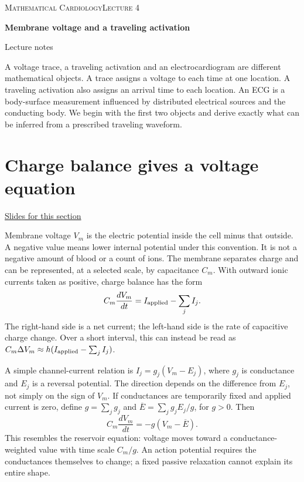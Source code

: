 \documentclass[11pt,letterpaper]{article}
\theoremstyle{definition}\newtheorem{definition}{Definition}\newtheorem{example}{Example}
\numberwithin{equation}{section}
\begin{document}
{\small\scshape Mathematical Cardiology\hfill Lecture 4}\par\medskip
{\raggedright{}\LARGE\bfseries\color{ink} Membrane voltage and a traveling activation\par}\medskip
{\small Lecture notes}\par\bigskip
A voltage trace, a traveling activation and an electrocardiogram are different mathematical objects. A trace assigns a voltage to each time at one location. A traveling activation also assigns an arrival time to each location. An ECG is a body-surface measurement influenced by distributed electrical sources and the conducting body. We begin with the first two objects and derive exactly what can be inferred from a prescribed traveling waveform.

\section{Charge balance gives a voltage equation}
\hypertarget{note-charge-balance-gives-a-voltage-equation}{}\label{note:charge-balance-gives-a-voltage-equation}
{\small \href{slides.html\#frame=three-different-observations\&step=1}{Slides for this section}}\par
Membrane voltage $V_m$ is the electric potential inside the cell minus that outside. A negative value means lower internal potential under this convention. It is not a negative amount of blood or a count of ions. The membrane separates charge and can be represented, at a selected scale, by capacitance $C_m$. With outward ionic currents taken as positive, charge balance has the form
\begin{equation}
C_m\frac{dV_m}{dt}=I_{\rm applied}-\sum_j I_j.
\end{equation}
The right-hand side is a net current; the left-hand side is the rate of capacitive charge change. Over a short interval, this can instead be read as $C_m\Delta V_m\approx h(I_{\rm applied}-\sum_j I_j)$.

A simple channel-current relation is $I_j=g_j(V_m-E_j)$, where $g_j$ is conductance and $E_j$ is a reversal potential. The direction depends on the difference from $E_j$, not simply on the sign of $V_m$. If conductances are temporarily fixed and applied current is zero, define $g=\sum_jg_j$ and $\overline E=\sum_jg_jE_j/g$, for $g>0$. Then
\[
C_m\frac{dV_m}{dt}=-g(V_m-\overline E).
\]
This resembles the reservoir equation: voltage moves toward a conductance-weighted value with time scale $C_m/g$. An action potential requires the conductances themselves to change; a fixed passive relaxation cannot explain its entire shape.
\end{document}
